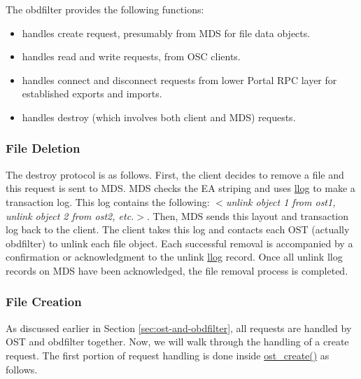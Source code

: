 The obdfilter provides the following functions:

\begin{itemize}
  
  \item handles create request, presumably from MDS for file data
  objects.

  \item handles read and write requests, from OSC clients.

  \item handles connect and disconnect requests from lower Portal RPC layer for
  established exports and imports.

  \item handles destroy (which involves both client and MDS) requests.

\end{itemize}

\subsubsection{File Deletion}

The destroy protocol is as follows. First, the client decides to remove a file and
this request is sent to MDS. MDS checks the EA striping and uses \url{llog}
to make a transaction log. This log contains the following:
$<$\textit{unlink object 1 from ost1, unlink object 2 from ost2, etc.}$>$.
Then, MDS sends this layout and transaction log back to the client. The
client takes this log and contacts each OST (actually obdfilter) to unlink each
file object. Each successful removal is accompanied by a confirmation or
acknowledgment to the unlink \url{llog} record. Once all unlink llog records on
MDS have been acknowledged, the file removal process is completed.


\subsubsection{File Creation}

As discussed earlier in Section \ref{sec:ost-and-obdfilter}, all requests are
handled by OST and obdfilter together.  Now, we will walk through the handling
of a create request. The first portion of request handling is done inside
\url{ost_create()} as follows.

